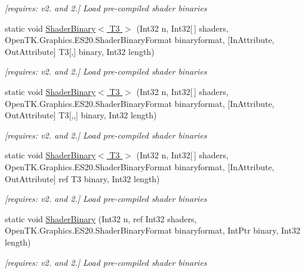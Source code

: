 \begin{DoxyCompactItemize}
\begin{DoxyCompactList}\small\item\em \mbox{[}requires\-: v2. and 2.\mbox{]} Load pre-\/compiled shader binaries \end{DoxyCompactList}\item 
static void \hyperlink{class_open_t_k_1_1_graphics_1_1_e_s20_1_1_g_l_a944ad937c8b158c92dd25713c0b62865}{Shader\-Binary$<$ T3 $>$} (Int32 n, Int32\mbox{[}$\,$\mbox{]} shaders, Open\-T\-K.\-Graphics.\-E\-S20.\-Shader\-Binary\-Format binaryformat, \mbox{[}In\-Attribute, Out\-Attribute\mbox{]} T3\mbox{[},\mbox{]} binary, Int32 length)
\begin{DoxyCompactList}\small\item\em \mbox{[}requires\-: v2. and 2.\mbox{]} Load pre-\/compiled shader binaries \end{DoxyCompactList}\item 
static void \hyperlink{class_open_t_k_1_1_graphics_1_1_e_s20_1_1_g_l_a87d43793b94d6656f4b30347797deb12}{Shader\-Binary$<$ T3 $>$} (Int32 n, Int32\mbox{[}$\,$\mbox{]} shaders, Open\-T\-K.\-Graphics.\-E\-S20.\-Shader\-Binary\-Format binaryformat, \mbox{[}In\-Attribute, Out\-Attribute\mbox{]} T3\mbox{[},,\mbox{]} binary, Int32 length)
\begin{DoxyCompactList}\small\item\em \mbox{[}requires\-: v2. and 2.\mbox{]} Load pre-\/compiled shader binaries \end{DoxyCompactList}\item 
static void \hyperlink{class_open_t_k_1_1_graphics_1_1_e_s20_1_1_g_l_aeda3d05f7d8bbb7c8535a50102ced348}{Shader\-Binary$<$ T3 $>$} (Int32 n, Int32\mbox{[}$\,$\mbox{]} shaders, Open\-T\-K.\-Graphics.\-E\-S20.\-Shader\-Binary\-Format binaryformat, \mbox{[}In\-Attribute, Out\-Attribute\mbox{]} ref T3 binary, Int32 length)
\begin{DoxyCompactList}\small\item\em \mbox{[}requires\-: v2. and 2.\mbox{]} Load pre-\/compiled shader binaries \end{DoxyCompactList}\item 
static void \hyperlink{class_open_t_k_1_1_graphics_1_1_e_s20_1_1_g_l_a01f550e6ce81e8d849b20c6250f28f39}{Shader\-Binary} (Int32 n, ref Int32 shaders, Open\-T\-K.\-Graphics.\-E\-S20.\-Shader\-Binary\-Format binaryformat, Int\-Ptr binary, Int32 length)
\begin{DoxyCompactList}\small\item\em \mbox{[}requires\-: v2. and 2.\mbox{]} Load pre-\/compiled shader binaries \end{DoxyCompactList}\item 

\end{DoxyCompactItemize}
